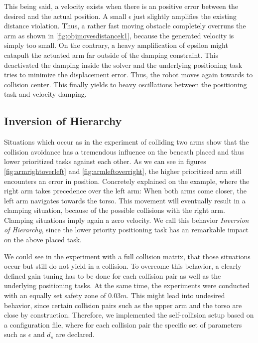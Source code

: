 This being said, a velocity exists when there is an positive error between the desired and the actual position. A small $\epsilon$ just slightly amplifies the existing distance violation. Thus, a rather fast moving obstacle completely overruns the arm as shown in \ref{fig:objmovesdistancek1}, because the generated velocity is simply too small. 
On the contrary, a heavy amplification of epsilon might catapult the actuated arm far outside of the damping constraint. This deactivated the damping inside the solver and the underlying positioning task tries to minimize the displacement error. Thus, the robot moves again towards to collision center. This finally yields to heavy oscillations between the positioning task and velocity damping.


\subsection{Inversion of Hierarchy}
Situations which occur as in the experiment of colliding two arms show that the collision avoidance has a tremendous influence on the beneath placed and thus lower prioritized tasks against each other. As we can see in figures \ref{fig:armrightoverleft} and \ref{fig:armleftoverright}, the higher prioritized arm still encounters an error in position. Concretely explained on the example, where the right arm takes precedence over the left arm: When both arms come closer, the left arm navigates towards the torso. This movement will eventually result in a clamping situation, because of the possible collisions with the right arm. Clamping situations imply again a zero velocity. We call this behavior \textit{Inversion of Hierarchy}, since the lower priority positioning task has an remarkable impact on the above placed task. 

We could see in the experiment with a full collision matrix, that those situations occur but still do not yield in a collision. To overcome this behavior, a clearly defined gain tuning has to be done for each collision pair as well as the underlying positioning tasks. At the same time, the experiments were conducted with an equally set safety zone of $0.03m$. This might lead into undesired behavior, since certain collision pairs such as the upper arm and the torso are close by construction. Therefore, we implemented the self-collision setup based on a configuration file, where for each collision pair the specific set of parameters such as $\epsilon$ and $d_s$ are declared. 
